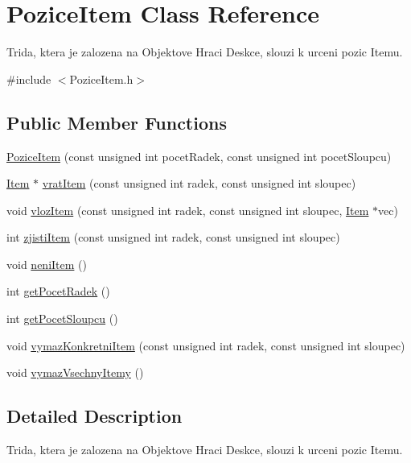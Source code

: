 \hypertarget{class_pozice_item}{\section{Pozice\-Item Class Reference}
\label{class_pozice_item}
}


Trida, ktera je zalozena na Objektove Hraci Deskce, slouzi k urceni pozic Itemu.  




{\ttfamily \#include $<$Pozice\-Item.\-h$>$}

\subsection*{Public Member Functions}
\begin{DoxyCompactItemize}
\item 
\hyperlink{class_pozice_item_aa5b04d84d119a08e8feac77743ee26f4}{Pozice\-Item} (const unsigned int pocet\-Radek, const unsigned int pocet\-Sloupcu)
\item 
\hyperlink{class_item}{Item} $\ast$ \hyperlink{class_pozice_item_a7abaef3b977c76bd2bb2b3ea567b88aa}{vrat\-Item} (const unsigned int radek, const unsigned int sloupec)
\item 
void \hyperlink{class_pozice_item_a4a0eb4d3b54b6600b216e6a8915d6a3c}{vloz\-Item} (const unsigned int radek, const unsigned int sloupec, \hyperlink{class_item}{Item} $\ast$vec)
\item 
int \hyperlink{class_pozice_item_a6435a58a36022e5fa883e14805de44a7}{zjisti\-Item} (const unsigned int radek, const unsigned int sloupec)
\item 
void \hyperlink{class_pozice_item_ad6685f316a930a8255d4d703ecd95c9d}{neni\-Item} ()
\item 
int \hyperlink{class_pozice_item_a448bef98fa9f5529c49ba079d2582e12}{get\-Pocet\-Radek} ()
\item 
int \hyperlink{class_pozice_item_a1cfbfc3f94cade75e314b4a0c5351775}{get\-Pocet\-Sloupcu} ()
\item 
void \hyperlink{class_pozice_item_a5a67efe5b7ada1af96f618af19e0d5bc}{vymaz\-Konkretni\-Item} (const unsigned int radek, const unsigned int sloupec)
\item 
void \hyperlink{class_pozice_item_a3c4ee689eb7e971119012af3f49ad568}{vymaz\-Vsechny\-Itemy} ()
\end{DoxyCompactItemize}


\subsection{Detailed Description}
Trida, ktera je zalozena na Objektove Hraci Deskce, slouzi k urceni pozic Itemu. 

